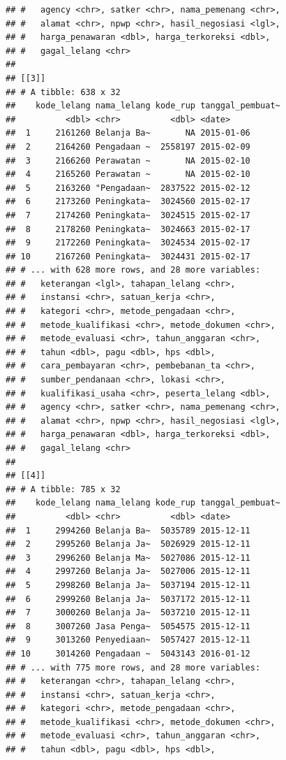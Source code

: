 \documentclass[]{book}
\begin{document}
\begin{verbatim}
## #   agency <chr>, satker <chr>, nama_pemenang <chr>,
## #   alamat <chr>, npwp <chr>, hasil_negosiasi <lgl>,
## #   harga_penawaran <dbl>, harga_terkoreksi <dbl>,
## #   gagal_lelang <chr>
## 
## [[3]]
## # A tibble: 638 x 32
##    kode_lelang nama_lelang kode_rup tanggal_pembuat~
##          <dbl> <chr>          <dbl> <date>          
##  1     2161260 Belanja Ba~       NA 2015-01-06      
##  2     2164260 Pengadaan ~  2558197 2015-02-09      
##  3     2166260 Perawatan ~       NA 2015-02-10      
##  4     2165260 Perawatan ~       NA 2015-02-10      
##  5     2163260 "Pengadaan~  2837522 2015-02-12      
##  6     2173260 Peningkata~  3024560 2015-02-17      
##  7     2174260 Peningkata~  3024515 2015-02-17      
##  8     2178260 Peningkata~  3024663 2015-02-17      
##  9     2172260 Peningkata~  3024534 2015-02-17      
## 10     2167260 Peningkata~  3024431 2015-02-17      
## # ... with 628 more rows, and 28 more variables:
## #   keterangan <lgl>, tahapan_lelang <chr>,
## #   instansi <chr>, satuan_kerja <chr>,
## #   kategori <chr>, metode_pengadaan <chr>,
## #   metode_kualifikasi <chr>, metode_dokumen <chr>,
## #   metode_evaluasi <chr>, tahun_anggaran <chr>,
## #   tahun <dbl>, pagu <dbl>, hps <dbl>,
## #   cara_pembayaran <chr>, pembebanan_ta <chr>,
## #   sumber_pendanaan <chr>, lokasi <chr>,
## #   kualifikasi_usaha <chr>, peserta_lelang <dbl>,
## #   agency <chr>, satker <chr>, nama_pemenang <chr>,
## #   alamat <chr>, npwp <chr>, hasil_negosiasi <lgl>,
## #   harga_penawaran <dbl>, harga_terkoreksi <dbl>,
## #   gagal_lelang <chr>
## 
## [[4]]
## # A tibble: 785 x 32
##    kode_lelang nama_lelang kode_rup tanggal_pembuat~
##          <dbl> <chr>          <dbl> <date>          
##  1     2994260 Belanja Ba~  5035789 2015-12-11      
##  2     2995260 Belanja Ja~  5026929 2015-12-11      
##  3     2996260 Belanja Ma~  5027086 2015-12-11      
##  4     2997260 Belanja Ja~  5027006 2015-12-11      
##  5     2998260 Belanja Ja~  5037194 2015-12-11      
##  6     2999260 Belanja Ja~  5037172 2015-12-11      
##  7     3000260 Belanja Ja~  5037210 2015-12-11      
##  8     3007260 Jasa Penga~  5054575 2015-12-11      
##  9     3013260 Penyediaan~  5057427 2015-12-11      
## 10     3014260 Pengadaan ~  5043143 2016-01-12      
## # ... with 775 more rows, and 28 more variables:
## #   keterangan <chr>, tahapan_lelang <chr>,
## #   instansi <chr>, satuan_kerja <chr>,
## #   kategori <chr>, metode_pengadaan <chr>,
## #   metode_kualifikasi <chr>, metode_dokumen <chr>,
## #   metode_evaluasi <chr>, tahun_anggaran <chr>,
## #   tahun <dbl>, pagu <dbl>, hps <dbl>,

\end{verbatim}
\end{document}
